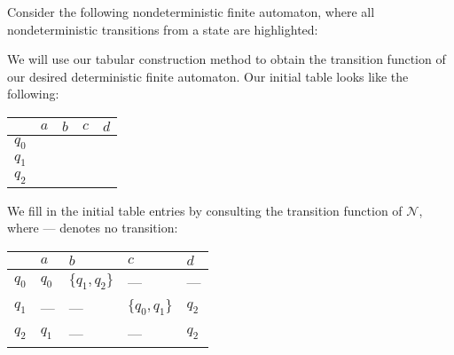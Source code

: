 \begin{example}
Consider the following nondeterministic finite automaton, where all nondeterministic transitions from a state are highlighted:
\begin{center}
\end{center}
We will use our tabular construction method to obtain the transition function of our desired deterministic finite automaton. Our initial table looks like the following:
\begin{center}
\small
\begin{tabular}{c | C{1.2cm} C{1.2cm} C{1.2cm} C{1.2cm}}
		& $a$ 	& $b$ 	& $c$ 	& $d$ \\
\hline
$q_{0}$	& 		& 		& 		& \\
$q_{1}$	& 		& 		& 		& \\
$q_{2}$	& 		& 		& 		& \\
\end{tabular}
\end{center}
We fill in the initial table entries by consulting the transition function of $\mathcal{N}$, where --- denotes no transition:
\begin{center}
\small
\begin{tabular}{c | C{1.2cm} C{1.2cm} C{1.2cm} C{1.2cm}}
		& $a$ 		& $b$ 				& $c$ 				& $d$ \\
\hline
$q_{0}$	& $q_{0}$		& $\{q_{1}, q_{2}\}$		& ---					& --- \\
$q_{1}$	& ---			& ---					& $\{q_{0}, q_{1}\}$		& $q_{2}$ \\
$q_{2}$	& $q_{1}$		& ---					& ---					& $q_{2}$ \\
\end{tabular}

\end{center}
\end{example}
